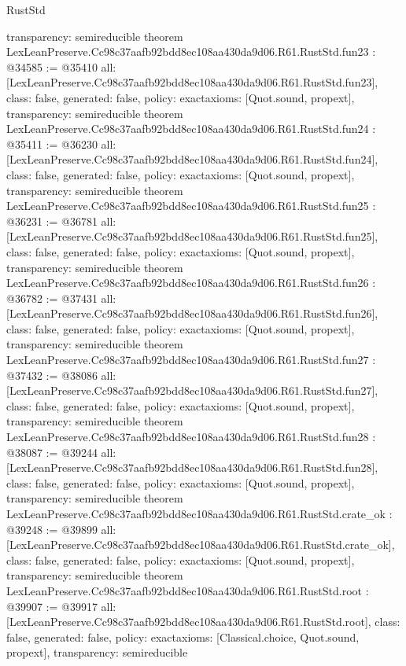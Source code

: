 \begin{lexlean}{RustStd}
\begin{coremodule}
{  transparency: semireducible
}
theorem LexLeanPreserve.Cc98c37aafb92bdd8ec108aa430da9d06.R61.RustStd.fun23 : @34585 := @35410 {
  all: [LexLeanPreserve.Cc98c37aafb92bdd8ec108aa430da9d06.R61.RustStd.fun23],
  class: false,
  generated: false,
  policy: exact{axioms: [Quot.sound, propext]},
  transparency: semireducible
}
theorem LexLeanPreserve.Cc98c37aafb92bdd8ec108aa430da9d06.R61.RustStd.fun24 : @35411 := @36230 {
  all: [LexLeanPreserve.Cc98c37aafb92bdd8ec108aa430da9d06.R61.RustStd.fun24],
  class: false,
  generated: false,
  policy: exact{axioms: [Quot.sound, propext]},
  transparency: semireducible
}
theorem LexLeanPreserve.Cc98c37aafb92bdd8ec108aa430da9d06.R61.RustStd.fun25 : @36231 := @36781 {
  all: [LexLeanPreserve.Cc98c37aafb92bdd8ec108aa430da9d06.R61.RustStd.fun25],
  class: false,
  generated: false,
  policy: exact{axioms: [Quot.sound, propext]},
  transparency: semireducible
}
theorem LexLeanPreserve.Cc98c37aafb92bdd8ec108aa430da9d06.R61.RustStd.fun26 : @36782 := @37431 {
  all: [LexLeanPreserve.Cc98c37aafb92bdd8ec108aa430da9d06.R61.RustStd.fun26],
  class: false,
  generated: false,
  policy: exact{axioms: [Quot.sound, propext]},
  transparency: semireducible
}
theorem LexLeanPreserve.Cc98c37aafb92bdd8ec108aa430da9d06.R61.RustStd.fun27 : @37432 := @38086 {
  all: [LexLeanPreserve.Cc98c37aafb92bdd8ec108aa430da9d06.R61.RustStd.fun27],
  class: false,
  generated: false,
  policy: exact{axioms: [Quot.sound, propext]},
  transparency: semireducible
}
theorem LexLeanPreserve.Cc98c37aafb92bdd8ec108aa430da9d06.R61.RustStd.fun28 : @38087 := @39244 {
  all: [LexLeanPreserve.Cc98c37aafb92bdd8ec108aa430da9d06.R61.RustStd.fun28],
  class: false,
  generated: false,
  policy: exact{axioms: [Quot.sound, propext]},
  transparency: semireducible
}
theorem LexLeanPreserve.Cc98c37aafb92bdd8ec108aa430da9d06.R61.RustStd.crate_ok : @39248 := @39899 {
  all: [LexLeanPreserve.Cc98c37aafb92bdd8ec108aa430da9d06.R61.RustStd.crate_ok],
  class: false,
  generated: false,
  policy: exact{axioms: [Quot.sound, propext]},
  transparency: semireducible
}
theorem LexLeanPreserve.Cc98c37aafb92bdd8ec108aa430da9d06.R61.RustStd.root : @39907 := @39917 {
  all: [LexLeanPreserve.Cc98c37aafb92bdd8ec108aa430da9d06.R61.RustStd.root],
  class: false,
  generated: false,
  policy: exact{axioms: [Classical.choice, Quot.sound, propext]},
  transparency: semireducible
}


\end{coremodule}
\end{lexlean}
